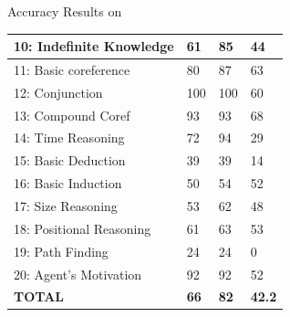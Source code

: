\documentclass[pdf]{beamer}
\begin{document}
\begin{frame}{Accuracy Results on }
\begin{table}[]
{\begin{tabular}{|l|l|l|l|}
10: Indefinite Knowledge & 61                                                             & 85                                                              & 44       \\ \hline
11: Basic coreference    & 80                                                             & 87                                                              & 63       \\ \hline
12: Conjunction          & 100                                                            & 100                                                             & 60       \\ \hline
13: Compound Coref       & 93                                                             & 93                                                              & 68       \\ \hline
14: Time Reasoning       & 72                                                             & 94                                                              & 29       \\ \hline
15: Basic Deduction      & 39                                                             & 39                                                              & 14       \\ \hline
16: Basic Induction      & 50                                                             & 54                                                              & 52       \\ \hline
17: Size Reasoning       & 53                                                             & 62                                                              & 48       \\ \hline
18: Positional Reasoning & 61                                                             & 63                                                              & 53       \\ \hline
19: Path Finding         & 24                                                             & 24                                                              & 0        \\ \hline
20: Agent's Motivation   & 92                                                             & 92                                                              & 52       \\ \hline
\textbf{TOTAL}           & \textbf{66}                                                    & \textbf{82}                                                     &       \textbf{42.2}    \\ \hline
\end{tabular}
}
\end{table}
\end{frame}
\end{document}
